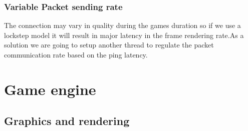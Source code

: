 \documentclass[ebook,12pt,oneside,openany]{article}
\begin{document}
\subsubsection{Variable Packet sending rate}
The connection may vary in quality during the games duration so if we use a lockstep model it will result in major latency in the frame rendering rate.As a solution we are going to setup another thread to regulate the packet communication rate based on the ping latency.



\section{Game engine}


\subsection{Graphics and rendering}
\end{document}
